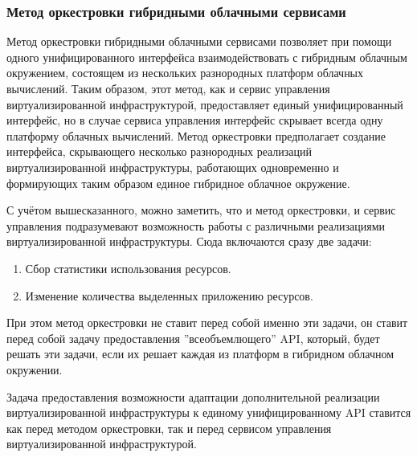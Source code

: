 \subsubsection*{Метод оркестровки гибридными облачными сервисами}
Метод оркестровки гибридными облачными сервисами\cite{orchestrating-hybrid-cloud-services} позволяет при помощи одного унифицированного интерфейса взаимодействовать с гибридным облачным окружением, состоящем из нескольких разнородных платформ облачных вычислений.
Таким образом, этот метод, как и сервис управления виртуализированной инфраструктурой, предоставляет единый унифицированный интерфейс, но в случае сервиса управления интерфейс скрывает всегда одну платформу облачных вычислений.
Метод оркестровки предполагает создание интерфейса, скрывающего несколько разнородных реализаций виртуализированной инфраструктуры, работающих одновременно и формирующих таким образом единое гибридное облачное окружение.

С учётом вышесказанного, можно заметить, что и метод оркестровки, и сервис управления подразумевают возможность работы с различными реализациями виртуализированной инфраструктуры.
Сюда включаются сразу две задачи:
\begin{enumerate}
    \item Сбор статистики использования ресурсов.
    \item Изменение количества выделенных приложению ресурсов.
\end{enumerate}
При этом метод оркестровки не ставит перед собой именно эти задачи, он ставит перед собой задачу предоставления ''всеобъемлющего'' API, который, будет решать эти задачи, если их решает каждая из платформ в гибридном облачном окружении.

Задача предоставления возможности адаптации дополнительной реализации виртуализированной инфраструктуры к единому унифицированному API ставится как перед методом оркестровки, так и перед сервисом управления виртуализированной инфраструктурой.
